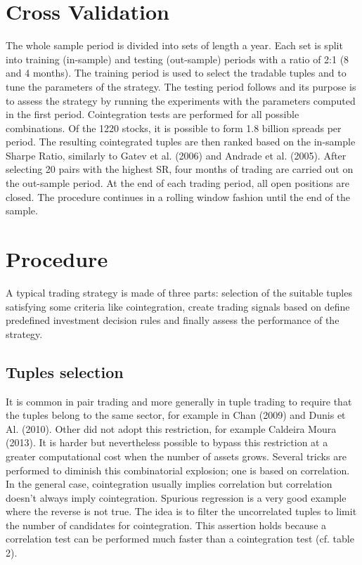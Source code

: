 \documentclass[11pt,a4,twosided,singlespacing,titlepagenumber=on]{scrreprt}
\numberwithin{equation}{chapter} %
\theoremstyle{remark}
\begin{document}
\section{Cross Validation}
The whole sample period is divided into sets of length a year. Each set is split into training (in-sample) and testing (out-sample) periods with a ratio of 2:1 (8 and 4 months). The training period is used to select the tradable tuples and to tune the parameters of the strategy. The testing period follows and its purpose is to assess the strategy by running the experiments with the parameters computed in the first period. Cointegration tests are performed for all possible combinations. Of the 1220 stocks, it is possible to form 1.8 billion spreads per period. The resulting cointegrated tuples are then ranked based on the in-sample Sharpe Ratio, similarly to Gatev et al. (2006) and Andrade et al. (2005). After selecting 20 pairs with the highest SR, four months of trading are carried out on the out-sample period. At the end of each trading period, all open positions are closed. The procedure continues in a rolling window fashion until the end of the sample.

\section{Procedure}
A typical trading strategy is made of three parts: selection of the suitable tuples satisfying some criteria like cointegration, create trading signals based on define predefined investment decision rules and finally assess the performance of the strategy.

\subsection{Tuples selection}
It is common in pair trading and more generally in tuple trading to require that the tuples belong to the same sector, for example in Chan (2009) and Dunis et Al. (2010). Other did not adopt this restriction, for example Caldeira Moura (2013). It is harder but nevertheless possible to bypass this restriction at a greater computational cost when the number of assets grows. Several tricks are performed to diminish this combinatorial explosion; one is based on correlation. In the general case, cointegration usually implies correlation but correlation doesn't always imply cointegration. Spurious regression is a very good example where the reverse is not true. The idea is to filter the uncorrelated tuples to limit the number of candidates for cointegration. This assertion holds because a correlation test can be performed much faster than a cointegration test (cf. table 2).
\end{document}
